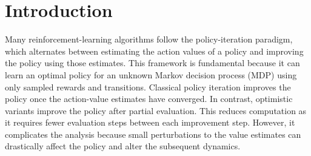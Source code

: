 \section{Introduction}




Many reinforcement-learning algorithms follow the policy-iteration paradigm, which alternates between 
estimating the action values of a policy 
and improving the policy using those estimates. 
This framework is fundamental because it can learn an optimal policy for an unknown Markov decision process (MDP) using only sampled rewards and transitions.
Classical policy iteration improves the policy once the action-value estimates have converged.
In contrast, optimistic variants improve the policy after partial evaluation.
This reduces computation as it requires fewer evaluation steps between each improvement step.
However, it complicates the analysis because 
small perturbations 
to the value estimates
can drastically affect the policy and alter the subsequent dynamics.


